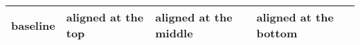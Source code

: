 \documentclass{article}
\begin{document}
\begin{tabular}{@{}lp{1.2cm}m{1.2cm}b{1.2cm}@{}}
  \hline
  baseline & aligned at the top & aligned at the middle
  & aligned at the bottom\\
  \hline
\end{tabular}
\end{document}
